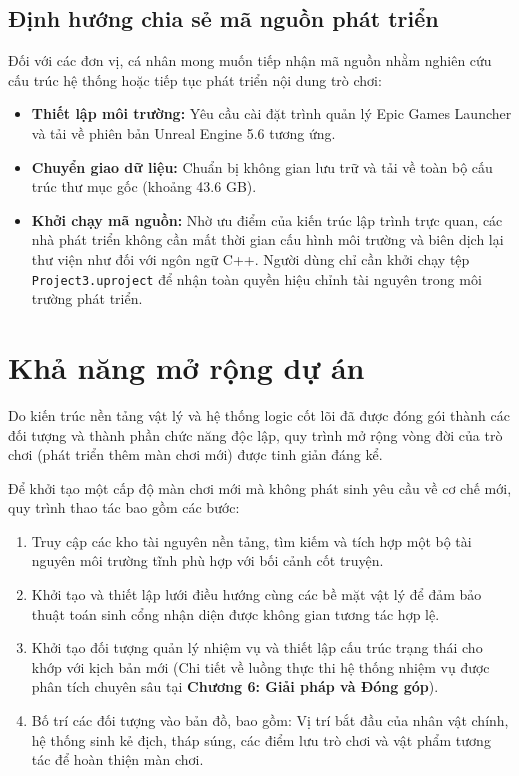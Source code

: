 \documentclass[../DoAn.tex]{subfiles}
\begin{document}
\subsection{Định hướng chia sẻ mã nguồn phát triển}
Đối với các đơn vị, cá nhân mong muốn tiếp nhận mã nguồn nhằm nghiên cứu cấu trúc hệ thống hoặc tiếp tục phát triển nội dung trò chơi:
\begin{itemize}
    \item \textbf{Thiết lập môi trường:} Yêu cầu cài đặt trình quản lý Epic Games Launcher và tải về phiên bản Unreal Engine 5.6 tương ứng.
    \item \textbf{Chuyển giao dữ liệu:} Chuẩn bị không gian lưu trữ và tải về toàn bộ cấu trúc thư mục gốc (khoảng 43.6 GB).
    \item \textbf{Khởi chạy mã nguồn:} Nhờ ưu điểm của kiến trúc lập trình trực quan, các nhà phát triển không cần mất thời gian cấu hình môi trường và biên dịch lại thư viện như đối với ngôn ngữ C++. Người dùng chỉ cần khởi chạy tệp \texttt{Project3.uproject} để nhận toàn quyền hiệu chỉnh tài nguyên trong môi trường phát triển.
\end{itemize}

\section{Khả năng mở rộng dự án}
Do kiến trúc nền tảng vật lý và hệ thống logic cốt lõi đã được đóng gói thành các đối tượng và thành phần chức năng độc lập, quy trình mở rộng vòng đời của trò chơi (phát triển thêm màn chơi mới) được tinh giản đáng kể.

Để khởi tạo một cấp độ màn chơi mới mà không phát sinh yêu cầu về cơ chế mới, quy trình thao tác bao gồm các bước:
\begin{enumerate}
    \item Truy cập các kho tài nguyên nền tảng, tìm kiếm và tích hợp một bộ tài nguyên môi trường tĩnh phù hợp với bối cảnh cốt truyện.
    \item Khởi tạo và thiết lập lưới điều hướng cùng các bề mặt vật lý để đảm bảo thuật toán sinh cổng nhận diện được không gian tương tác hợp lệ.
    \item Khởi tạo đối tượng quản lý nhiệm vụ và thiết lập cấu trúc trạng thái cho khớp với kịch bản mới (Chi tiết về luồng thực thi hệ thống nhiệm vụ được phân tích chuyên sâu tại \textbf{Chương 6: Giải pháp và Đóng góp}).
    \item Bố trí các đối tượng vào bản đồ, bao gồm: Vị trí bắt đầu của nhân vật chính, hệ thống sinh kẻ địch, tháp súng, các điểm lưu trò chơi và vật phẩm tương tác để hoàn thiện màn chơi.
\end{enumerate}
\end{document}
